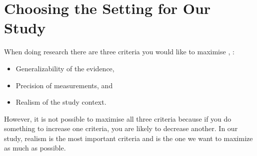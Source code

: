 \section{Choosing the Setting for Our Study}
\label{sec:experimental}
When doing research there are three criteria you would like to maximise \cite{McGrath}, \cite{alsos}: 

\begin{itemize}
\item Generalizability of the evidence,
\item Precision of measurements, and 
\item Realism of the study context.  
\end{itemize}

However, it is not possible to maximise all three criteria because if you do something to increase one criteria, you are likely to decrease another. In our study, realism is the most important criteria and is the one we want to maximize as much as possible.

